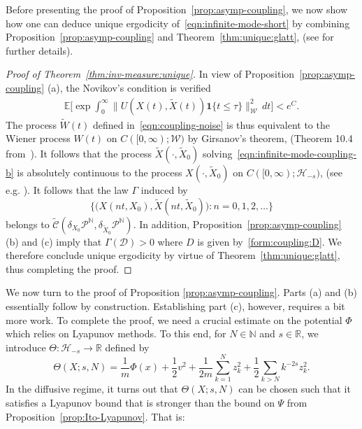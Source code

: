 \documentclass[11pt]{amsart}
\theoremstyle{definition}
\newcommand{\nbb}{\mathbb{N}}
\newcommand{\rbb}{\mathbb{R}}
\newcommand{\W}{\mathcal{W}}
\renewcommand{\H}{\mathcal{H}}
\newcommand{\PMarkov}{\mathcal{P}}
\newcommand{\Xtil}{\widetilde{X}}
\newcommand{\Enone}[1]{\mathbb{E}#1}
\newcommand{\wt}[1]{ \widetilde{#1} }
\newcommand{\Hs}{\mathcal{H}_{-s}}
\theoremstyle{definition}
\theoremstyle{plain}
\numberwithin{equation}{section}
\begin{document}
Before presenting the proof of Proposition~\ref{prop:asymp-coupling}, we now show how one can deduce unique ergodicity of~\eqref{eqn:infinite-mode-short} by combining Proposition~\ref{prop:asymp-coupling} and Theorem~\ref{thm:unique:glatt}, (see \cite{hairer2011asymptotic,  glatt2017unique} for further details).
\begin{proof}[Proof of Theorem~\ref{thm:inv-measure:unique}] In view of Proposition~\ref{prop:asymp-coupling} (a), the Novikov's condition is verified
\begin{align*}
\Enone\Big[\exp{\int_0^\infty \|U(X(t),\Xtil(t)) \textbf{1}\{t\leq\tau\}\|_\W^2 \, dt}\Big]<e^C.
\end{align*}
The process $\wt{W}(t)$ defined in~\eqref{eqn:coupling-noise} is thus equivalent to the Wiener process $W(t)$ on $C([0,\infty);\W)$ by Girsanov's theorem, (Theorem 10.4 from~\cite{da2014stochastic}). It follows that the process $\wt{X}(\cdot,\wt{X}_0)$ solving~\eqref{eqn:infinite-mode-coupling-b} is absolutely continuous to the process $X(\cdot,\Xtil_0)$ on $C([0,\infty);\Hs)$, (see e.g. \cite{revuz2013continuous}). It follows that the law $\Gamma$ induced by 
\begin{displaymath}
\big\{\big( X(nt,X_0),\Xtil(nt,\Xtil_0) \big):n=0,1,2,\dots\big\}
\end{displaymath} belongs to $\wt{\mathcal{C}}(\delta_{X_0}\PMarkov^\nbb,\delta_{\Xtil_0}\PMarkov^\nbb)$. In addition, Proposition~\ref{prop:asymp-coupling} (b) and (c) imply that $\Gamma(\mathscr{D})>0$ where $D$ is given by~\eqref{form:coupling:D}. We therefore conclude unique ergodicity by virtue of Theorem~\ref{thm:unique:glatt}, thus completing the proof.
\end{proof}
We now turn to the proof of Proposition \ref{prop:asymp-coupling}. Parts (a) and (b) essentially follow by construction.  Establishing part (c), however, requires a bit more work.  To complete the proof, we need a crucial estimate on the potential $\Phi$ which relies on Lyapunov methods.  To this end, for $N \in \nbb$ and $s \in \rbb$, we introduce $\Theta:\H_{-s}\to\rbb$ defined by 
\begin{equation} \label{eqn:Lyapunov:diffusive}
\Theta(X ; s, N)=\frac{1}{m}\Phi(x)+\frac{1}{2} v^2+\frac{1}{2m}\sum_{k=1}^N z_k^2+\frac{1}{2}\sum_{k > N}k^{-2s}z_k^2.
\end{equation}
In the diffusive regime, it turns out that $\Theta(X;s,N)$ can be chosen such that it satisfies a Lyapunov bound that is stronger than the bound on $\Psi$ from Proposition~\ref{prop:Ito-Lyapunov}. That is:
\end{document}

